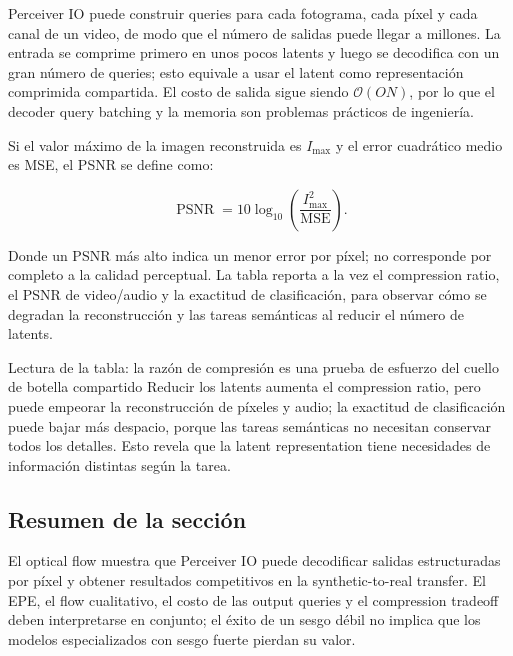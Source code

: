 Perceiver IO puede construir queries para cada fotograma, cada píxel y cada canal de un video, de modo que el número de salidas puede llegar a millones. La entrada se comprime primero en unos pocos latents y luego se decodifica con un gran número de queries; esto equivale a usar el latent como representación comprimida compartida. El costo de salida sigue siendo $\mathcal{O}(ON)$, por lo que el decoder query batching y la memoria son problemas prácticos de ingeniería.


Si el valor máximo de la imagen reconstruida es $I_{\max}$ y el error cuadrático medio es MSE, el PSNR se define como:

\[
\operatorname{PSNR}=10\log_{10}\left(\frac{I_{\max}^2}{\operatorname{MSE}}\right).
\]

Donde un PSNR más alto indica un menor error por píxel; no corresponde por completo a la calidad perceptual. La tabla reporta a la vez el compression ratio, el PSNR de video/audio y la exactitud de clasificación, para observar cómo se degradan la reconstrucción y las tareas semánticas al reducir el número de latents.


\begin{knowledgebox}{Lectura de la tabla: la razón de compresión es una prueba de esfuerzo del cuello de botella compartido}
Reducir los latents aumenta el compression ratio, pero puede empeorar la reconstrucción de píxeles y audio; la exactitud de clasificación puede bajar más despacio, porque las tareas semánticas no necesitan conservar todos los detalles. Esto revela que la latent representation tiene necesidades de información distintas según la tarea.
\end{knowledgebox}

\subsection{Resumen de la sección}

El optical flow muestra que Perceiver IO puede decodificar salidas estructuradas por píxel y obtener resultados competitivos en la synthetic-to-real transfer. El EPE, el flow cualitativo, el costo de las output queries y el compression tradeoff deben interpretarse en conjunto; el éxito de un sesgo débil no implica que los modelos especializados con sesgo fuerte pierdan su valor.
